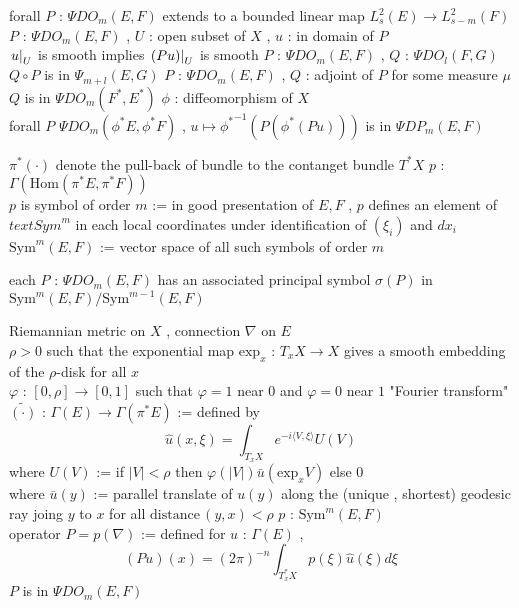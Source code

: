 \begin{Theorem}
\itemprop
  \Then forall \(P\) : \(\Psi DO_m(E,F)\) extends to a bounded linear map \(L^2_{s}(E) \to L^2_{s - m}(F)\)
\itemprop
  \For \(P\) : \(\Psi DO_m(E,F)\) , \(U\) : open subset of \(X\) , \(u\) : in domain of \(P\) \\
  \Then \(\left. {u} \right| _{U}\) is smooth implies \(\left. {(P u)} \right| _{U}\) is smooth
\itemprop
  \For \(P\) : \(\Psi DO_m(E,F)\) , \(Q\) : \(\Psi DO_l(F,G)\) \\
  \Then \(Q \circ P\) is in \(\Psi_{m+l}(E,G)\)
\itemprop
  \For \(P\) : \(\Psi DO_m(E,F)\) , \(Q\) : adjoint of \(P\) for some measure \(\mu\) \\
  \Then \(Q\) is in \(\Psi DO_m(F^* , E^*)\)
\itemprop
  \For \(\phi\) : diffeomorphism of \(X\)  \\
  \Then forall \(P\) \(\Psi DO_{m}(\phi^* E , \phi^* F)\) , \(u \mapsto {\phi^*}^{-1} (P (\phi^* (P u)))\) is in \(\Psi DP_m (E,F)\) \\
\end{Theorem}

\begin{Definition}
\itemwhen
  \Let \(\pi^*(\cdot )\) denote the pull-back of bundle to the contanget bundle \(T^*X\)
\itemdefi
  \For \(p\) : \(\Gamma(\text{Hom}(\pi^*E , \pi^*F))\) \\
  \Define \(p\) is symbol of order \(m\) := in good presentation of \(E , F\) , \(p\) defines an element of \(text{Sym}^m\) in each local coordinates under identification of \((\xi_i)\) and \(d x_i\)
\itemdefi
  \Define \(\text{Sym}^m(E,F)\) := vector space of all such symbols of order \(m\)
\end{Definition}

\begin{Theorem}
\itemprop
  \Then each \(P\) : \(\Psi DO_m(E,F)\) has an associated principal symbol \(\sigma(P)\) in \(\text{Sym}^m(E,F) / \text{Sym}^{m-1}(E,F)\)
\end{Theorem}

\begin{Definition}
\itemwhen
  \Fix Riemannian metric on \(X\) , connection \(\nabla\) on \(E\) \\
  \Fix \(\rho > 0\) such that the exponential map \(\text{exp}_{x}\) : \(T_x X \to X\) gives a smooth embedding of the \(\rho\)-disk for all \(x\) \\
  \Fix \(\varphi\) : \([0,\rho] \to [0,1]\) such that \(\varphi = 1\) near \(0\) and \(\varphi = 0\) near \(1\)
\itemdefi
  \Define "Fourier transform" \(\tilde{(\cdot)}\) : \(\Gamma(E) \to \Gamma(\pi^* E)\) := defined by
  \[\hat{u}(x,\xi) = \int_{T_x X} e^{-i \langle V , \xi \rangle} U(V)\]
  where \(U(V)\) := if \(\lvert V \rvert < \rho\) then \(\varphi (\lvert V \rvert) \bar{u}(\text{exp}_x V)\) else \(0\) \\
  where \(\bar{u}(y)\) := parallel translate of \(u(y)\) along the (unique , shortest) geodesic ray joing \(y\) to \(x\) for all \(\text{distance} \, (y,x) < \rho\)
\itemdefi
  \For \(p\) : \(\text{Sym}^m(E,F)\) \\
  \Define operator \(P = p(\nabla)\) := defined for \(u\) : \(\Gamma(E)\) ,
  \[(P u) (x) = (2\pi)^{-n} \int_{T_x^*X} p(\xi)\hat{u}(\xi) d\xi\]
\itemprop
  \Then \(P\) is in \(\Psi DO_m(E,F)\)
\end{Definition}